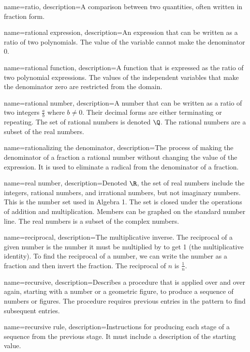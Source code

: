  {
	name=ratio,
	description={A comparison between two quantities, often written in fraction form.}
}

 {
	name=rational expression,
	description={An expression that can be written as a ratio of two polynomials. The value of the variable cannot make the denominator 0.}
}

 {
	name=rational function,
	description={A function that is expressed as the ratio of two polynomial expressions. The values of the independent variables that make the denominator zero are restricted from the domain.}
}

 {
	name=rational number,
	description={A number that can be written as a ratio of two integers $\frac{a}{b}$ where $b \neq 0$. Their decimal forms are either terminating or repeating. The set of rational numbers is denoted $\Q$. The rational numbers are a subset of the real numbers.}
}

 {
	name=rationalizing the denominator,
	description={The process of making the denominator of a fraction a rational number without changing the value of the expression. It is used to eliminate a radical from the denominator of a fraction.}
}

 {
	name=real number,
	description={Denoted $\R$, the set of real numbers include the integers, rational numbers, and irrational numbers, but not imaginary numbers. This is the number set used in Algebra 1. The set is closed under the operations of addition and multiplication. Members can be graphed on the standard number line.  The real numbers is a subset of the complex numbers.}
}

 {
	name=reciprocal,
	description={The multiplicative inverse. The reciprocal of a given number is the number it must be multiplied by to get 1 (the multiplicative identity). To find the reciprocal of a number, we can write the number as a fraction and then invert the fraction. The reciprocal of $n$ is $\frac{1}{n}$.}
}

 {
	name=recursive,
	description={Describes a procedure that is applied over and over again, starting with a number or a geometric figure, to produce a sequence of numbers or figures. The procedure requires previous entries in the pattern to find subsequent entries.}
}

 {
	name=recursive rule,
	description={Instructions for producing each stage of a sequence from the previous stage. It must include a description of the starting value.}
}

